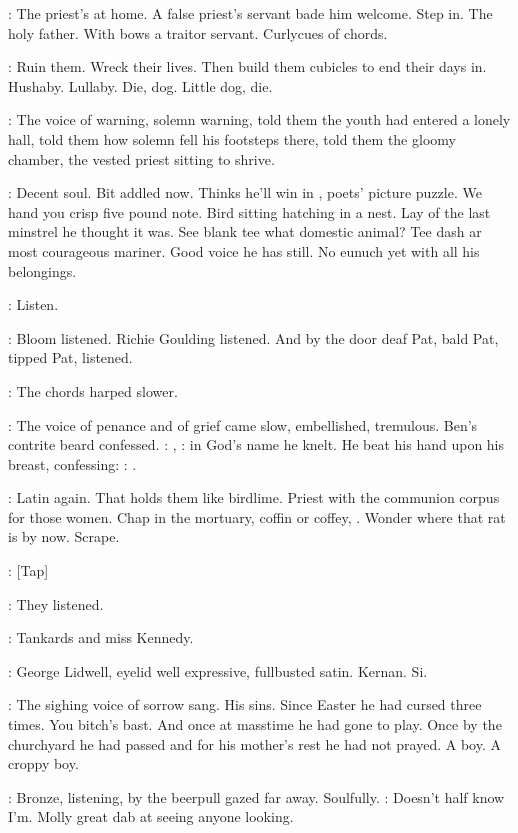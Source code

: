 :
The priest's at home. A false priest's servant bade him welcome. Step
in. The holy father. With bows a traitor servant. Curlycues of chords.

\BloomInt:
Ruin them. Wreck their lives. Then build them cubicles to end their
days in. Hushaby. Lullaby. Die, dog. Little dog, die.

:
The voice of warning,
solemn warning, told them the youth had
entered a lonely hall, told them how solemn fell his footsteps there, told
them the gloomy chamber, the vested priest sitting to shrive.

\BloomInt:
Decent soul. Bit addled now. Thinks he'll win in
, poets' picture puzzle.
We hand you crisp five pound note. Bird sitting hatching
in a nest. Lay of the last minstrel he thought it was. See blank tee what
domestic animal? Tee dash ar most courageous mariner. Good voice he has
still. No eunuch yet with all his belongings.

\BloomInt:
Listen.

:
Bloom listened. Richie Goulding listened. And by the door
deaf Pat, bald Pat, tipped Pat, listened.

:
The chords harped slower.

:
The voice of penance and of grief came slow, embellished, tremulous.
Ben's contrite beard confessed.
\Dollard:
,
:
in God's name he knelt.
He beat his hand upon his breast, confessing:
\Dollard:
.

\BloomInt:
Latin again. That holds them like birdlime. Priest with the
communion corpus for those women. Chap in the mortuary, coffin or
coffey, .
Wonder where that rat is by now. Scrape.

\Stripling:
[Tap]

:
They listened.

:
Tankards and miss Kennedy.

:
George Lidwell, eyelid
well expressive, fullbusted satin. Kernan. Si.

:
The sighing voice of sorrow sang.
His sins. Since Easter he had
cursed three times. You bitch's bast. And once at masstime he had gone to
play. Once by the churchyard he had passed and for his mother's rest he
had not prayed. A boy. A croppy boy.

:
Bronze, listening, by the beerpull gazed far away. Soulfully.
\BloomInt:
Doesn't half know I'm. Molly great dab at seeing anyone looking.

